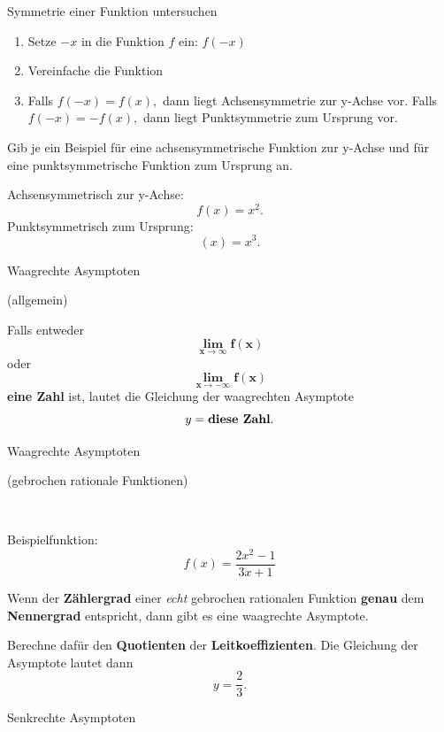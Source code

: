\documentclass[paper=a6,ngerman,twoside=true,fontsize=14pt, parskip = half]{scrartcl}
\begin{document}
\begin{frage}
	Symmetrie einer Funktion untersuchen
\end{frage}
\begin{antwort}
	\begin{enumerate}
		\item Setze $-x$ in die Funktion $f$ ein: $f(-x)$
		\item Vereinfache die Funktion
		\item Falls $f(-x)=f(x),$ dann liegt Achsensymmetrie zur y-Achse vor. 
			Falls \\ $f(-x)=-f(x),$ dann liegt Punktsymmetrie zum Ursprung vor.
	\end{enumerate}
\end{antwort}
\begin{frage}
	Gib je ein Beispiel für eine achsensymmetrische Funktion zur y-Achse und für eine punktsymmetrische Funktion zum Ursprung an.
\end{frage}
\begin{antwort}
	Achsensymmetrisch zur y-Achse: \[f(x)=x^2.\]
	Punktsymmetrisch zum Ursprung: \[(x)=x^3.\]
\end{antwort}
\begin{frage}
	Waagrechte Asymptoten
	
	\normalsize
	(allgemein)
\end{frage}
\begin{antwort}
		Falls entweder 
		\[\bm{\lim\limits_{x \rightarrow \infty}{f(x)}}\] oder
		\[\bm{\lim\limits_{x \rightarrow -\infty}{f(x)}}\]
		\textbf{eine Zahl} ist, lautet die Gleichung der 
		 waagrechten Asymptote 
		 \[ y = \text{\bfseries diese Zahl}.\]
\end{antwort}
\begin{frage}
	Waagrechte Asymptoten

	\normalsize
	(gebrochen rationale Funktionen)

	~

	Beispielfunktion:
	\[f(x)=\frac{2x^2-1}{3x+1}\]
\end{frage}
\begin{antwort}
		Wenn der \textbf{Zählergrad} einer \emph{echt} ge\-bro\-chen rat\-io\-nalen Funktion 
			\textbf{genau} dem \textbf{Nennergrad} entspricht, 
			dann gibt es eine waagrechte Asymptote.	

		Berechne dafür den \textbf{Quotienten} der \textbf{Leit\-koeffizienten}. 
			Die Gleichung der Asymptote lautet dann
			\[y=\frac{2}{3}.\]
\end{antwort}
\begin{frage}
	Senkrechte Asymptoten
\end{frage}
\end{document}
